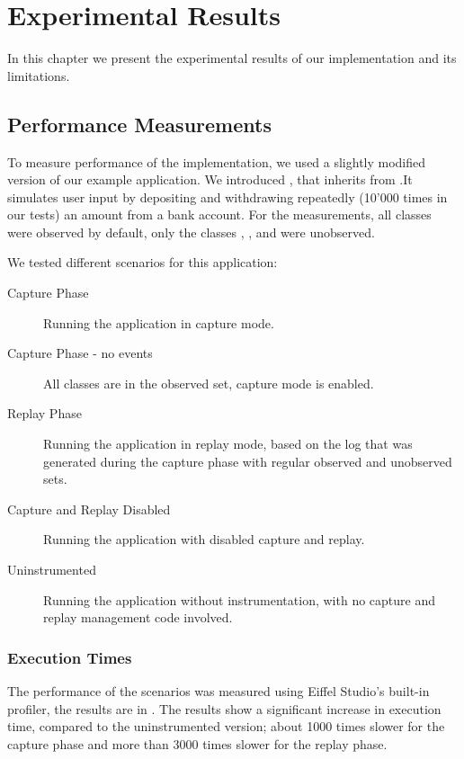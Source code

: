 \chapter{Experimental Results}
In this chapter we present the experimental results of our implementation and its limitations.


\section{Performance Measurements}
To measure performance of the implementation, we used a slightly modified version of our example application. We introduced , that inherits from .It simulates user input by depositing and withdrawing repeatedly (10'000 times in our tests) an amount from a bank account. For the measurements, all classes were observed by default, only the classes , ,  and  were unobserved.

We tested different scenarios for this application:

\begin{description}
 \item [Capture Phase] Running the application in capture mode.
 \item [Capture Phase - no events] All classes are in the observed set, capture mode is enabled.
 \item [Replay Phase] Running the application in replay mode, based on the log that was generated during the capture phase with regular observed and unobserved sets.
 \item [Capture and Replay Disabled] Running the application with disabled capture and replay.
 \item [Uninstrumented] Running the application without instrumentation, with no capture and replay management code involved.
\end{description}


\subsection{Execution Times}
The performance of the scenarios was measured using Eiffel Studio's built-in profiler, the results are in . The results show a significant increase in execution time, compared to the uninstrumented version; about 1000 times slower for the capture phase and more than 3000 times slower for the replay phase.

